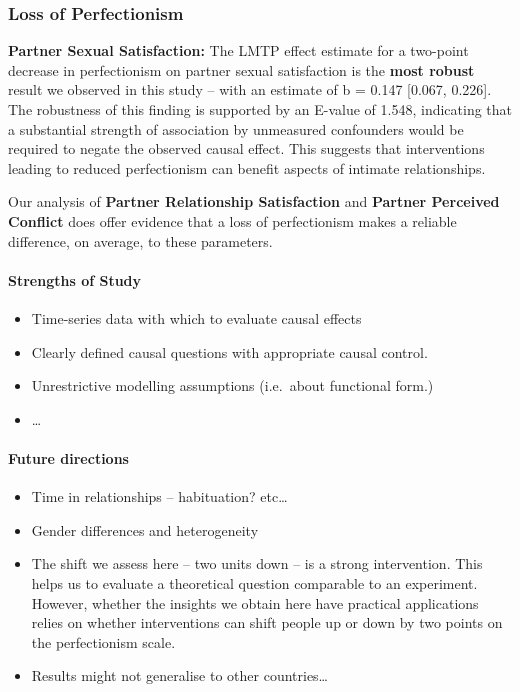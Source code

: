 \documentclass[
  singlecolumn]{article}
\let\oldparagraph\paragraph
\renewcommand{\paragraph}[1]{\oldparagraph{#1}\mbox{}}
\providecommand{\tightlist}{%
  \setlength{\itemsep}{0pt}\setlength{\parskip}{0pt}}\usepackage{longtable,booktabs,array}
\begin{document}
\subsubsection{Loss of Perfectionism}\label{loss-of-perfectionism}

\textbf{Partner Sexual Satisfaction:} The LMTP effect estimate for a
two-point decrease in perfectionism on partner sexual satisfaction is
the \textbf{most robust} result we observed in this study -- with an
estimate of b = 0.147 {[}0.067, 0.226{]}. The robustness of this finding
is supported by an E-value of 1.548, indicating that a substantial
strength of association by unmeasured confounders would be required to
negate the observed causal effect. This suggests that interventions
leading to reduced perfectionism can benefit aspects of intimate
relationships.

Our analysis of \textbf{Partner Relationship Satisfaction} and
\textbf{Partner Perceived Conflict} does offer evidence that a loss of
perfectionism makes a reliable difference, on average, to these
parameters.

\paragraph{Strengths of Study}\label{strengths-of-study}

\begin{itemize}
\tightlist
\item
  Time-series data with which to evaluate causal effects
\item
  Clearly defined causal questions with appropriate causal control.
\item
  Unrestrictive modelling assumptions (i.e.~about functional form.)
\item
  \ldots{}
\end{itemize}

\paragraph{Future directions}\label{future-directions}

\begin{itemize}
\tightlist
\item
  Time in relationships -- habituation? etc\ldots{}
\item
  Gender differences and heterogeneity
\item
  The shift we assess here -- two units down -- is a strong
  intervention. This helps us to evaluate a theoretical question
  comparable to an experiment. However, whether the insights we obtain
  here have practical applications relies on whether interventions can
  shift people up or down by two points on the perfectionism scale.
\item
  Results might not generalise to other countries\ldots{}
\end{itemize}
\end{document}

